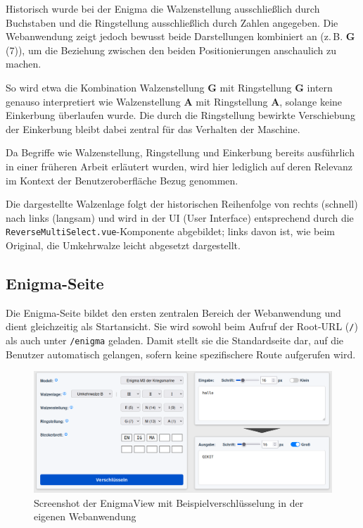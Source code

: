 \documentclass[12pt, ngerman, a4paper, numbers=noenddot]{article}
\begin{document}
Historisch wurde bei der Enigma die Walzenstellung ausschließlich durch Buchstaben und die Ringstellung ausschließlich durch Zahlen angegeben. Die Webanwendung zeigt jedoch bewusst beide Darstellungen kombiniert an (z.\,B. \textbf{G} (7)), um die Beziehung zwischen den beiden Positionierungen anschaulich zu machen. 

So wird etwa die Kombination Walzenstellung \textbf{G} mit Ringstellung \textbf{G} intern genauso interpretiert wie Walzenstellung \textbf{A} mit Ringstellung \textbf{A}, solange keine Einkerbung überlaufen wurde. Die durch die Ringstellung bewirkte Verschiebung der Einkerbung bleibt dabei zentral für das Verhalten der Maschine.

Da Begriffe wie Walzenstellung, Ringstellung und Einkerbung bereits ausführlich in einer früheren Arbeit erläutert wurden, wird hier lediglich auf deren Relevanz im Kontext der Benutzeroberfläche Bezug genommen.

Die dargestellte Walzenlage folgt der historischen Reihenfolge von rechts (schnell) nach links (langsam) und wird in der UI (User Interface) entsprechend durch die \lstinline|ReverseMultiSelect.vue|-Komponente abgebildet; links davon ist, wie beim Original, die Umkehrwalze leicht abgesetzt dargestellt.



\subsection{Enigma-Seite}


Die Enigma-Seite bildet den ersten zentralen Bereich der Webanwendung und dient gleichzeitig als Startansicht. Sie wird sowohl beim Aufruf der Root-URL (\lstinline|/|) als auch unter \lstinline|/enigma| geladen. Damit stellt sie die Standardseite dar, auf die Benutzer automatisch gelangen, sofern keine spezifischere Route aufgerufen wird.

\begin{figure}[H]
	\centering
	\includegraphics[width=1\textwidth]{bilder/EnigmaView.png}
	\caption{Screenshot der EnigmaView mit Beispielverschlüsselung in der eigenen Webanwendung}
	\label{fig:EnigmaView}
\end{figure}
\end{document}
